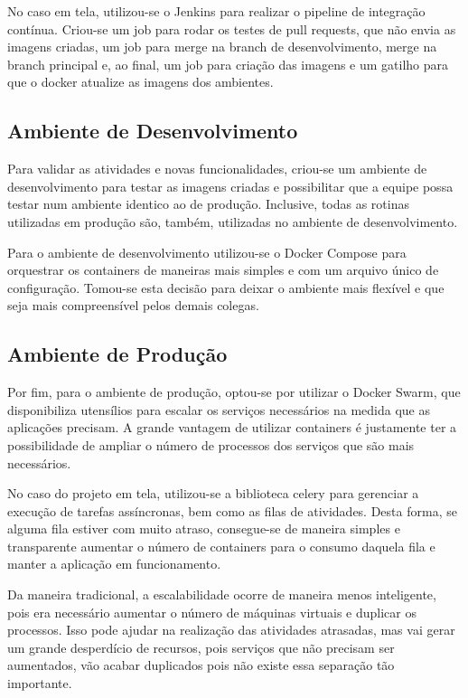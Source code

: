 \documentclass[
	12pt,				%
	openright,			%
	oneside,			%
	a4paper,			%
	chapter=TITLE,		%
	section=TITLE,		%
	english,			%
	french,				%
	spanish,			%
	brazil				%
	]{abntex2}
\begin{document}
No caso em tela, utilizou-se o Jenkins para realizar o pipeline de integração contínua. Criou-se um job para rodar os testes de pull requests, que não envia as imagens criadas, um job para merge na branch de desenvolvimento, merge na branch principal e, ao final, um job para criação das imagens e um gatilho para que o docker atualize as imagens dos ambientes.

\subsection{Ambiente de Desenvolvimento}

Para validar as atividades e novas funcionalidades, criou-se um ambiente de desenvolvimento para testar as imagens criadas e possibilitar que a equipe possa testar num ambiente identico ao de produção. Inclusive, todas as rotinas utilizadas em produção são, também, utilizadas no ambiente de desenvolvimento.

Para o ambiente de desenvolvimento utilizou-se o Docker Compose para orquestrar os containers de maneiras mais simples e com um arquivo único de configuração. Tomou-se esta decisão para deixar o ambiente mais flexível e que seja mais compreensível pelos demais colegas.

\subsection{Ambiente de Produção}

Por fim, para o ambiente de produção, optou-se por utilizar o Docker Swarm, que disponibiliza utensílios para escalar os serviços necessários na medida que as aplicações precisam. A grande vantagem de utilizar containers é justamente ter a possibilidade de ampliar o número de processos dos serviços que são mais necessários.

No caso do projeto em tela, utilizou-se a biblioteca celery para gerenciar a execução de tarefas assíncronas, bem como as filas de atividades. Desta forma, se alguma fila estiver com muito atraso, consegue-se de maneira simples e transparente aumentar o número de containers para o consumo daquela fila e manter a aplicação em funcionamento.

Da maneira tradicional, a escalabilidade ocorre de maneira menos inteligente, pois era necessário aumentar o número de máquinas virtuais e duplicar os processos. Isso pode ajudar na realização das atividades atrasadas, mas vai gerar um grande desperdício de recursos, pois serviços que não precisam ser aumentados, vão acabar duplicados pois não existe essa separação tão importante.
\end{document}
